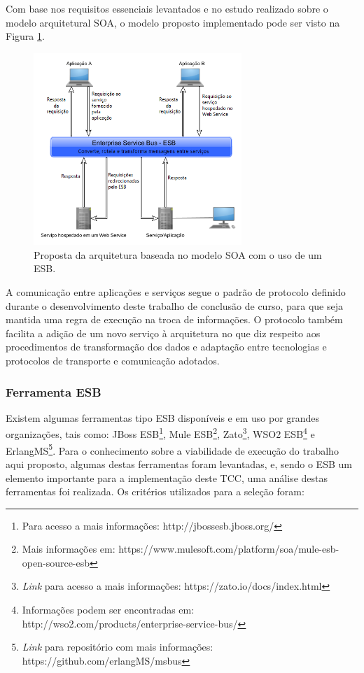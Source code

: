 Com base nos requisitos essenciais levantados e no estudo realizado sobre o modelo arquitetural SOA, o modelo proposto implementado pode ser visto na Figura \ref{uso_esb}.

\begin{figure}[!hbt]
\centering
\includegraphics[width=0.7\textwidth]{figuras/uso_esb.png}
\caption{Proposta da arquitetura baseada no modelo SOA com o uso de um ESB.}
\label{uso_esb}
\end{figure}

A comunicação entre aplicações e serviços segue o padrão de protocolo definido durante o desenvolvimento deste trabalho de conclusão de curso, para que seja mantida uma regra de execução na troca de informações. O protocolo também facilita a adição de um novo serviço à arquitetura no que diz respeito aos procedimentos de transformação dos dados e adaptação entre tecnologias e protocolos de transporte e comunicação adotados.

\subsubsection{Ferramenta ESB}
Existem algumas ferramentas tipo ESB disponíveis e em uso por grandes organizações, tais como: JBoss ESB\footnote{Para acesso a mais informações: http://jbossesb.jboss.org/}, Mule ESB\footnote{Mais informações em: https://www.mulesoft.com/platform/soa/mule-esb-open-source-esb}, Zato\footnote{\textit{Link} para acesso a mais informações: https://zato.io/docs/index.html}, WSO2 ESB\footnote{Informações podem ser encontradas em: http://wso2.com/products/enterprise-service-bus/} e ErlangMS\footnote{\textit{Link} para repositório com mais informações: https://github.com/erlangMS/msbus}. Para o conhecimento sobre a viabilidade de execução do trabalho aqui proposto, algumas destas ferramentas foram levantadas, e, sendo o ESB um elemento importante para a implementação deste TCC, uma análise destas ferramentas foi realizada. Os critérios utilizados para a seleção foram:

